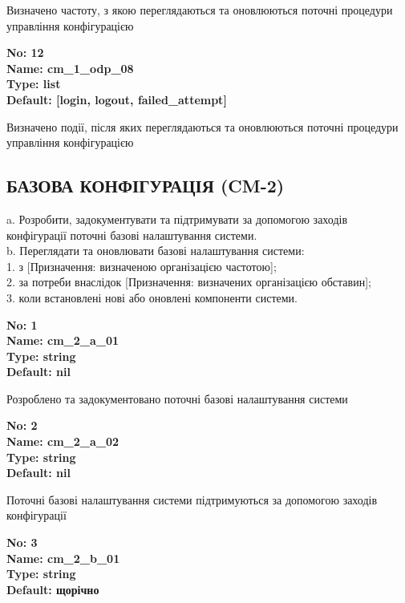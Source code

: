 \documentclass{article}
\begin{document}
{\footnotesize Визначено частоту, з якою переглядаються та оновлюються поточні процедури управління конфігурацією}


{\footnotesize\bfseries
No: 12\\
Name: cm\_\allowbreak{}1\_\allowbreak{}odp\_\allowbreak{}08\\
Type: list\\
Default: [\textquotedbl{}login\textquotedbl{}, \textquotedbl{}logout\textquotedbl{}, \textquotedbl{}failed\_\allowbreak{}attempt\textquotedbl{}]
}

{\footnotesize Визначено події, після яких переглядаються та оновлюються поточні процедури управління конфігурацією}




\subsection{БАЗОВА КОНФІГУРАЦІЯ (CM-2)}
a. Розробити, задокументувати та підтримувати за допомогою заходів конфігурації поточні базові налаштування системи.\\ 
b. Переглядати та оновлювати базові налаштування системи:\\ 
1. з [Призначення: визначеною організацією частотою];\\ 
2. за потреби внаслідок [Призначення: визначених організацією обставин];\\ 
3. коли встановлені нові або оновлені компоненти системи.

\vspace{10pt}
{\footnotesize\bfseries
No: 1\\
Name: cm\_\allowbreak{}2\_\allowbreak{}a\_\allowbreak{}01\\
Type: string\\
Default: nil
}

{\footnotesize Розроблено та задокументовано поточні базові налаштування системи}


{\footnotesize\bfseries
No: 2\\
Name: cm\_\allowbreak{}2\_\allowbreak{}a\_\allowbreak{}02\\
Type: string\\
Default: nil
}

{\footnotesize Поточні базові налаштування системи підтримуються за допомогою заходів конфігурації}


{\footnotesize\bfseries
No: 3\\
Name: cm\_\allowbreak{}2\_\allowbreak{}b\_\allowbreak{}01\\
Type: string\\
Default: \textquotedbl{}щорічно\textquotedbl{}
}
\end{document}
